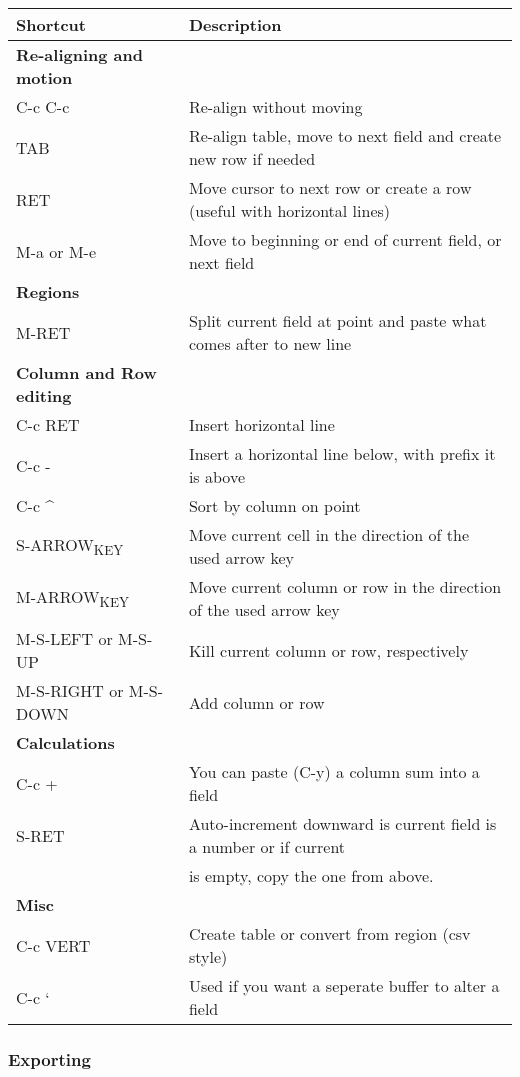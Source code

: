 \documentclass[11pt]{article}
\begin{document}
\begin{center}
\begin{tabular}{ll}
\hline
Shortcut & Description\\
\hline
\textbf{Re-aligning and motion} & \\
\hline
C-c C-c & Re-align without moving\\
TAB & Re-align table, move to next field and create new row if needed\\
RET & Move cursor to next row or create a row (useful with horizontal lines)\\
M-a or M-e & Move to beginning or end of current field, or next field\\
\hline
\textbf{Regions} & \\
\hline
M-RET & Split current field at point and paste what comes after to new line\\
\hline
\textbf{Column and Row editing} & \\
\hline
C-c RET & Insert horizontal line\\
C-c - & Insert a horizontal line below, with prefix it is above\\
C-c \^{} & Sort by column on point\\
S-ARROW\textsubscript{KEY} & Move current cell in the direction of the used arrow key\\
M-ARROW\textsubscript{KEY} & Move current column or row in the direction of the used arrow key\\
M-S-LEFT or M-S-UP & Kill current column or row, respectively\\
M-S-RIGHT or M-S-DOWN & Add column or row\\
\hline
\textbf{Calculations} & \\
\hline
C-c + & You can paste (C-y) a column sum into a field\\
S-RET & Auto-increment downward is current field is a number or if current\\
 & is empty, copy the one from above.\\
\hline
\textbf{Misc} & \\
\hline
C-c VERT & Create table or convert from region (csv style)\\
C-c ` & Used if you want a seperate buffer to alter a field\\
\hline
\end{tabular}
\end{center}
\subsubsection{Exporting}
\label{sec:org02865f7}
\end{document}
